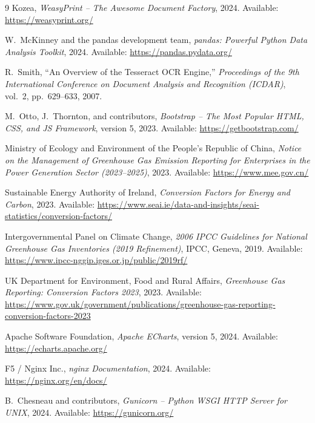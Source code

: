 \documentclass[11pt,a4paper]{article}
\begin{document}
\begin{thebibliography}{9}
Kozea,
\textit{WeasyPrint -- The Awesome Document Factory},
2024.
Available: \url{https://weasyprint.org/}

W.~McKinney and the pandas development team,
\textit{pandas: Powerful Python Data Analysis Toolkit},
2024.
Available: \url{https://pandas.pydata.org/}

R.~Smith,
``An Overview of the Tesseract OCR Engine,''
\textit{Proceedings of the 9th International Conference on Document Analysis and Recognition (ICDAR)}, vol.~2, pp.~629--633, 2007.

M.~Otto, J.~Thornton, and contributors,
\textit{Bootstrap -- The Most Popular HTML, CSS, and JS Framework}, version 5,
2023.
Available: \url{https://getbootstrap.com/}

Ministry of Ecology and Environment of the People's Republic of China,
\textit{Notice on the Management of Greenhouse Gas Emission Reporting for Enterprises in the Power Generation Sector (2023--2025)},
2023.
Available: \url{https://www.mee.gov.cn/}

Sustainable Energy Authority of Ireland,
\textit{Conversion Factors for Energy and Carbon},
2023.
Available: \url{https://www.seai.ie/data-and-insights/seai-statistics/conversion-factors/}

Intergovernmental Panel on Climate Change,
\textit{2006 IPCC Guidelines for National Greenhouse Gas Inventories (2019 Refinement)},
IPCC, Geneva, 2019.
Available: \url{https://www.ipcc-nggip.iges.or.jp/public/2019rf/}

UK Department for Environment, Food and Rural Affairs,
\textit{Greenhouse Gas Reporting: Conversion Factors 2023},
2023.
Available: \url{https://www.gov.uk/government/publications/greenhouse-gas-reporting-conversion-factors-2023}

Apache Software Foundation,
\textit{Apache ECharts},
version 5, 2024.
Available: \url{https://echarts.apache.org/}

F5 / Nginx Inc.,
\textit{nginx Documentation},
2024.
Available: \url{https://nginx.org/en/docs/}

B.~Chesneau and contributors,
\textit{Gunicorn -- Python WSGI HTTP Server for UNIX},
2024.
Available: \url{https://gunicorn.org/}

\end{thebibliography}
\end{document}
